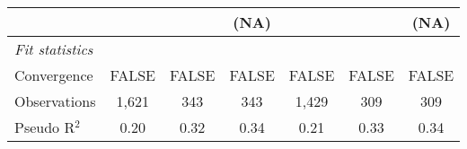 \begin{tabular}{lcccccc}
                                                                              &                        &                        & (NA)                   &                        &                        & (NA)\\   
   \midrule
   \emph{Fit statistics}\\
   Convergence                                                                &FALSE                   & FALSE                  & FALSE                  & FALSE                  & FALSE                  & FALSE\\  
   Observations                                                               & 1,621                  & 343                    & 343                    & 1,429                  & 309                    & 309\\  
   Pseudo R$^2$                                                               & 0.20                   & 0.32                   & 0.34                   & 0.21                   & 0.33                   & 0.34\\  
   

\end{tabular}
